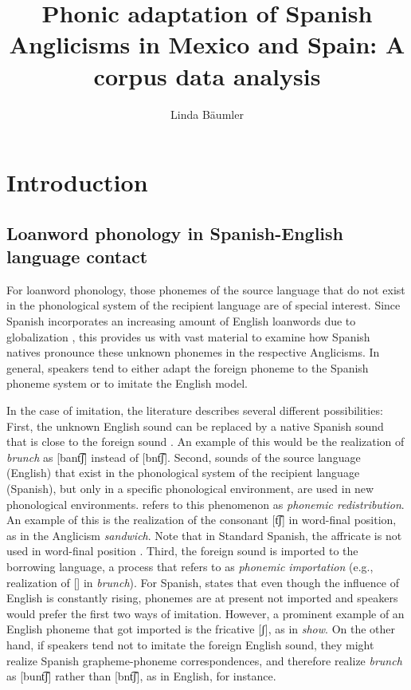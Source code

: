 \documentclass[output=paper]{langscibook}
\author{Linda Bäumler \orcid{0000-0002-0290-4930} \affiliation{University of Vienna}}
\title[Phonic adaptation of Spanish Anglicisms in Mexico and Spain]{Phonic adaptation of Spanish Anglicisms in Mexico and Spain: A corpus data analysis}
\begin{document}
\maketitle

\section{Introduction}
\subsection{Loanword phonology in Spanish-English language contact}
\label{baumler:sec:loanword_phonology}

For loanword phonology, those phonemes of the source language that do not exist in the phonological system of the recipient language are of special interest. Since Spanish incorporates an increasing amount of English loanwords due to globalization \citetext{\citealp[95]{Cabanillas2012}; \citealp[116]{Oncins-Martinez2009}; \citealp[16]{GomezCapuz2001}; \citealp[]{Schweickard1991}}, this provides us with vast material to examine how Spanish natives pronounce these unknown phonemes in the respective Anglicisms. In general, speakers tend to either adapt the foreign phoneme to the Spanish phoneme system or to imitate the English model. 

In the case of imitation, the literature describes several different possibilities: First, the unknown English sound can be replaced by a native Spanish sound that is close to the foreign sound \citetext{\citealp[8]{Kang2011}; \citealp[27, 52]{GomezCapuz2001}; \citealp[155]{Pratt1980}}. An example of this would be the realization of \textit{brunch} as [b\textfishhookr ant͡ʃ] instead of [b\textturnr \textturnv nt͡ʃ]. Second, sounds of the source language (English) that exist in the phonological system of the recipient language (Spanish), but only in a specific phonological environment, are used in new phonological environments. \citet[216]{Haugen1950} refers to this phenomenon as \textit{phonemic redistribution}. An example of this is the realization of the consonant [t͡ʃ] in word-final position, as in the Anglicism \textit{sandwich}. Note that in Standard Spanish, the affricate is not used in word-final position \citep[49]{GomezCapuz2001}. Third, the foreign sound is imported to the borrowing language, a process that \citet[216]{Haugen1950} refers to as \textit{phonemic importation} (e.g., realization of [\textturnv] in \textit{brunch}). For Spanish, \citet[52]{GomezCapuz2001} states that even though the influence of English is constantly rising, phonemes are at present not imported and speakers would prefer the first two ways of imitation. However, a prominent example of an English phoneme that got imported is the fricative [ʃ], as in \textit{show}. On the other hand, if speakers tend not to imitate the foreign English sound, they might realize Spanish grapheme-phoneme correspondences, and therefore realize \textit{brunch} as [b\textfishhookr unt͡ʃ] rather than [b\textturnr \textturnv nt͡ʃ], as in English, for instance.
\end{document}
